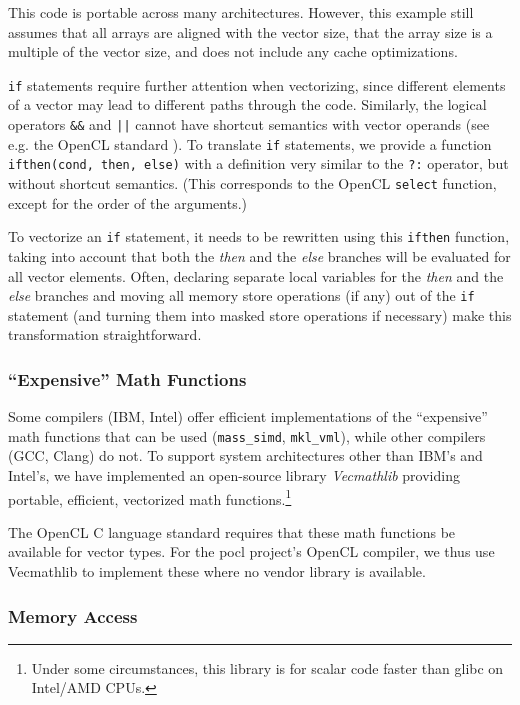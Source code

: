 \documentclass[conference]{IEEEtran}
\begin{document}
\noindent This code is portable across many architectures. However,
this example still assumes that all arrays are aligned with the vector
size, that the array size is a multiple of the vector size, and does
not include any cache optimizations.

\verb+if+ statements require further attention when vectorizing, since
different elements of a vector may lead to different paths through the
code. Similarly, the logical operators \verb+&&+ and \verb+||+ cannot
have shortcut semantics with vector operands (see e.g. the OpenCL
standard \cite{openclweb}). To translate \verb+if+ statements, we provide a
function \verb+ifthen(cond, then, else)+ with a definition very
similar to the \verb+?:+ operator, but without shortcut semantics.
(This corresponds to the OpenCL \verb+select+ function, except for the
order of the arguments.)

To vectorize an \verb+if+ statement, it needs to be rewritten using this
\verb+ifthen+ function, taking into account that both the \emph{then}
and the \emph{else} branches will be evaluated for all vector
elements. Often, declaring separate local variables for the
\emph{then} and the \emph{else} branches and moving all memory store
operations (if any) out of the \verb+if+ statement (and turning them into
masked store operations if necessary) make this transformation
straightforward.

\subsubsection{``Expensive'' Math Functions}

Some compilers (IBM, Intel) offer efficient implementations of the
``expensive'' math functions that can be used
(\verb+mass_simd+, \verb+mkl_vml+), while other compilers (GCC, Clang)
do not. To support system architectures other than IBM's and Intel's,
we have implemented an open-source library \emph{Vecmathlib}
\cite{vecmathlibweb, Jaaskelainen2013} providing portable, efficient,
vectorized math functions.\footnote{Under some circumstances, this
  library is for scalar code faster than glibc on Intel/AMD CPUs.}

The OpenCL C language standard requires that these math functions be
available for vector types. For the pocl project's OpenCL compiler, we
thus use Vecmathlib to implement these where no vendor library is
available.

\subsubsection{Memory Access}
\end{document}
